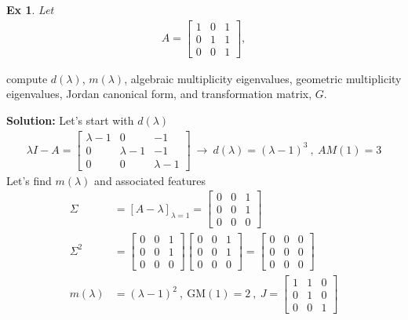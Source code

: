 \documentclass[twoside]{article}
\newtheorem{exmp}[theorem]{Ex}
\begin{document}
\begin{exmp}
	Let 
\begin{align*}
A = \left[ \begin{array}{ccc} 1 & 0 & 1 \\ 0 & 1 & 1 \\ 0 & 0 & 1
\end{array} \right] , 
\end{align*}
\end{exmp}
%
compute $d(\lambda)$, $m(\lambda)$, algebraic multiplicity eigenvalues, geometric multiplicity eigenvalues, Jordan canonical form, and transformation matrix, $G$.

\textbf{Solution:} Let's start with  $d(\lambda)$
%
\begin{align*}
  \lambda I - A = \left[ \begin{array}{ccc} \lambda - 1 & 0 & -1 \\ 0 & \lambda - 1 & -1 \\ 0 & 0 & \lambda - 1 \end{array} \right] 
  \ \rightarrow \ d(\lambda) = (\lambda - 1)^3 \ , \ AM(1) = 3
\end{align*}
% 
Let's find $m(\lambda)$ and associated features
%
%
\begin{align*}
  \Sigma &= \left[ A - \lambda \right]_{\lambda = 1} = \left[ \begin{array}{ccc} 0 & 0 & 1 \\ 0 & 0 & 1 \\ 0 & 0 & 0 \end{array} \right] 
  \\
  \Sigma^2 &= \left[ \begin{array}{ccc} 0 & 0 & 1 \\ 0 & 0 & 1 \\ 0 & 0 & 0 \end{array} \right]  \left[ \begin{array}{ccc} 0 & 0 & 1 \\ 0 & 0 & 1 \\ 0 & 0 & 0 \end{array} \right] = \left[ \begin{array}{ccc} 0 & 0 & 0 \\ 0 & 0 & 0 \\ 0 & 0 & 0 \end{array} \right]
\\
  m(\lambda) &= (\lambda - 1)^2 \ , \ \mathrm{GM}(1) = 2 \ , \ J = \left[ \begin{array}{ccc} 1 & 1 & 0 \\ 0 & 1 & 0 \\ 0 & 0 & 1 \end{array} \right] 
\end{align*}
\end{document}
